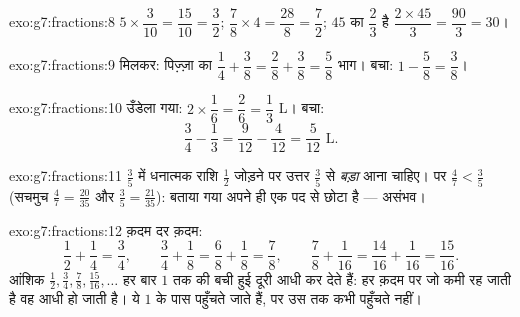 \begin{solution}{exo:g7:fractions:8}
$5 \times \dfrac{3}{10} = \dfrac{15}{10} = \dfrac32$; \quad
$\dfrac78 \times 4 = \dfrac{28}{8} = \dfrac72$; \quad
$45$ का $\dfrac23$ है $\dfrac{2 \times 45}{3} = \dfrac{90}{3} = 30$।
\end{solution}

\begin{solution}{exo:g7:fractions:9}
मिलकर: पिज़्ज़ा का $\dfrac14 + \dfrac38 = \dfrac28 + \dfrac38 =
\dfrac58$ भाग। बचा: $1 - \dfrac58 = \dfrac38$।
\end{solution}

\begin{solution}{exo:g7:fractions:10}
उँडेला गया: $2 \times \dfrac16 = \dfrac26 = \dfrac13$ L। बचा:
\[
\frac34 - \frac13 = \frac{9}{12} - \frac{4}{12} = \frac{5}{12}
\text{ L}.
\]
\end{solution}

\begin{solution}{exo:g7:fractions:11}
$\frac35$ में धनात्मक राशि $\frac12$ जोड़ने पर उत्तर $\frac35$ से
\emph{बड़ा} आना चाहिए। पर $\frac47 < \frac35$ (सचमुच
$\frac47 = \frac{20}{35}$ और $\frac35 = \frac{21}{35}$): बताया गया
 अपने ही एक पद से छोटा है --- असंभव।
\end{solution}

\begin{solution}{exo:g7:fractions:12}
क़दम दर क़दम:
\[
\frac12 + \frac14 = \frac34, \qquad
\frac34 + \frac18 = \frac68 + \frac18 = \frac78, \qquad
\frac78 + \frac1{16} = \frac{14}{16} + \frac1{16} = \frac{15}{16}.
\]
आंशिक  $\frac12, \frac34, \frac78, \frac{15}{16}, \dots$ हर बार
$1$ तक की बची हुई दूरी आधी कर देते हैं: हर क़दम पर जो कमी रह जाती है
वह आधी हो जाती है। ये  $1$ के पास पहुँचते जाते हैं, पर उस तक
कभी पहुँचते नहीं।
\end{solution}

